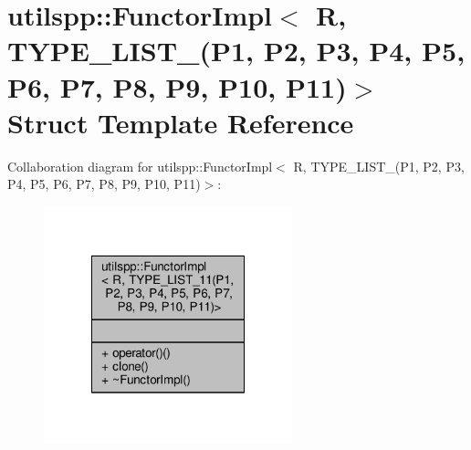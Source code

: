 \hypertarget{structutilspp_1_1FunctorImpl_3_01R_00_01TYPE__LIST__11_07P1_00_01P2_00_01P3_00_01P4_00_01P5_00_02390a23e4d9e9c3c4133bb7a8d48a2c0}{\section{utilspp\-:\-:Functor\-Impl$<$ R, T\-Y\-P\-E\-\_\-\-L\-I\-S\-T\-\_(P1, P2, P3, P4, P5, P6, P7, P8, P9, P10, P11)$>$ Struct Template Reference}
\label{structutilspp_1_1FunctorImpl_3_01R_00_01TYPE__LIST__11_07P1_00_01P2_00_01P3_00_01P4_00_01P5_00_02390a23e4d9e9c3c4133bb7a8d48a2c0}
}


Collaboration diagram for utilspp\-:\-:Functor\-Impl$<$ R, T\-Y\-P\-E\-\_\-\-L\-I\-S\-T\-\_(P1, P2, P3, P4, P5, P6, P7, P8, P9, P10, P11)$>$\-:
\nopagebreak
\begin{figure}[H]
\begin{center}
\leavevmode
\includegraphics[width=204pt]{structutilspp_1_1FunctorImpl_3_01R_00_01TYPE__LIST__11_07P1_00_01P2_00_01P3_00_01P4_00_01P5_00_08053957277ae9681bf1c10b376e5d869}
\end{center}
\end{figure}
